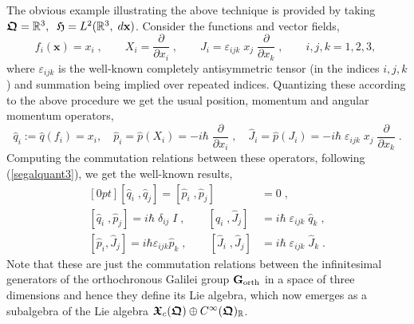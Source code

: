 \documentclass[12pt]{amsart}
\numberwithin{equation}{section}
\theoremstyle{remark}
\newcommand\HH{\mathfrak H}
\newcommand\RR{\mathbb R}
\newcommand{\be}{\begin{equation}}
\newcommand{\en}{\end{equation}}
\newcommand{\bfrakQ}{\mbox{\boldmath $\mathfrak Q$}}
\newcommand{\bfrakX}{\mbox{\boldmath $\mathfrak X$}}
\newcommand{\bx}{\mathbf x}
\newcommand{\CinfRQ}{C^\infty(\bfrakQ)_{\RR}}
\begin{document}
The obvious example illustrating the above technique is provided by
taking  $\bfrakQ = {\mathbb R}^3  , \;\; \HH = L^2 ({\mathbb R}^3 , \; d\bx )$.
Consider the functions and vector fields,
\be
  f_i (\bx ) = x_i\; , \qquad X_i = \frac \partial{\partial x_i} \; , \qquad
  J_i = \varepsilon_{ijk}\; x_j\; \frac \partial{\partial x_k}\;,  \qquad
  i,j,k = 1,2,3, \;
\label{funcandvects}
\en
where $\varepsilon_{ijk}$ is the well-known completely antisymmetric tensor
(in the indices $i,j,k$) and summation being implied over repeated indices.
Quantizing these according to the above procedure we get the usual position,
momentum and angular momentum operators,
\be
  \widehat{q}_i := \widehat{q}(f_i ) = x_i , \quad
  \widehat{p}_i = \widehat{p}(X_i) =
               -i\hbar\; \frac {\partial}{\partial x_i}\;,
   \quad \widehat{J}_i = \widehat{p}(J_i) =
- i\hbar\; \varepsilon_{ijk}\; x_j\; \frac \partial{\partial x_k}\; .
\label{segalquant7}
\en
Computing the commutation relations between these operators, following
(\ref{segalquant3}), we get the well-known results,
\be \begin{aligned}[0pt]
    [\widehat{q}_i \; , \widehat{q}_j ] =  [\widehat{p}_i \; ,
     \widehat{p}_j ] & =  0 \; , \\
[\widehat{q}_i \; , \widehat{p}_j ]  =  i\hbar\; \delta_{ij} \; I\; , \qquad
[\widehat{q}_i \; , \widehat{J}_j ] & =  i\hbar\; \varepsilon_{ijk}\;
\widehat{q}_k \; , \\
[\widehat{p}_i , \widehat{J}_j ] = i\hbar \varepsilon_{ijk}\widehat{p}_k \;
, \qquad [\widehat{J}_i \; , \widehat{J}_j ]& =  i\hbar\; \varepsilon_{ijk}\;
\widehat{J}_k     \; .
\end{aligned} \label{segalquant8} \en
Note that these are just the commutation relations between the infinitesimal
generators of the orthochronous Galilei group ${\mathbf G}_{\rm orth}$
in a space of three dimensions and hence
they define its Lie algebra,
which now emerges as a subalgebra of the Lie algebra
$\bfrakX_c (\bfrakQ )\oplus \CinfRQ$.
\end{document}
